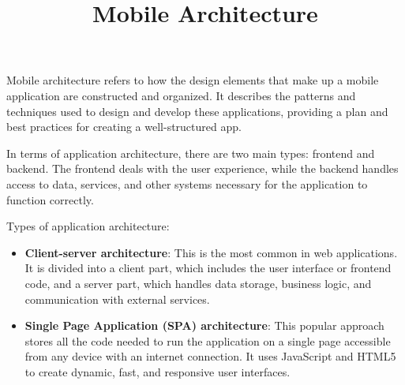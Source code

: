\documentclass{article}
\title{Mobile Architecture}
\author{}
\date{}
\begin{document}
\maketitle

Mobile architecture refers to how the design elements that make up a mobile application are constructed and organized. It describes the patterns and techniques used to design and develop these applications, providing a plan and best practices for creating a well-structured app.

In terms of application architecture, there are two main types: frontend and backend. The frontend deals with the user experience, while the backend handles access to data, services, and other systems necessary for the application to function correctly.

Types of application architecture:

\begin{itemize}
    \item \textbf{Client-server architecture}: This is the most common in web applications. It is divided into a client part, which includes the user interface or frontend code, and a server part, which handles data storage, business logic, and communication with external services.
    
    \item \textbf{Single Page Application (SPA) architecture}: This popular approach stores all the code needed to run the application on a single page accessible from any device with an internet connection. It uses JavaScript and HTML5 to create dynamic, fast, and responsive user interfaces.
\end{itemize}
\end{document}
